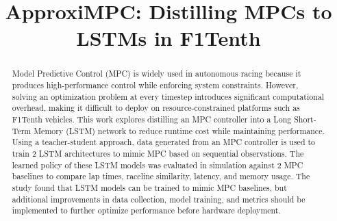 \documentclass[conference]{IEEEtran}
\begin{document}
\title{ApproxiMPC: Distilling MPCs to LSTMs in F1Tenth}

\author{
\and
{}
\and
{}
\and
{}
}

\maketitle

\begin{abstract}
Model Predictive Control (MPC) is widely used in autonomous racing because it produces high-performance control while enforcing system constraints. However, solving an optimization problem at every timestep introduces significant computational overhead, making it difficult to deploy on resource-constrained platforms such as F1Tenth vehicles. This work explores distilling an MPC controller into a Long Short-Term Memory (LSTM) network to reduce runtime cost while maintaining performance. Using a teacher-student approach, data generated from an MPC controller is used to train 2 LSTM architectures to mimic MPC based on sequential observations. The learned policy of these LSTM models was evaluated in simulation against 2 MPC baselines to compare lap times, raceline similarity, latency, and memory usage. The study found that LSTM models can be trained to mimic MPC baselines, but additional improvements in data collection, model training, and metrics should be implemented to further optimize performance before hardware deployment.
\end{abstract}
\end{document}
